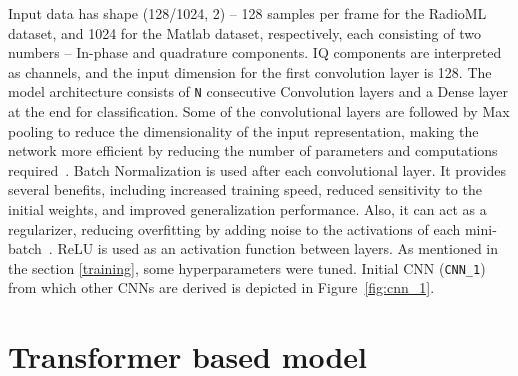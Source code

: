 Input data has shape (128/1024, 2) -- 128 samples per frame for the RadioML dataset, and 1024 for the Matlab dataset, respectively, each consisting of two numbers -- In-phase and quadrature components. IQ components are interpreted as channels, and the input dimension for the first convolution layer is 128. The model architecture consists of \verb|N| consecutive Convolution layers and a Dense layer at the end for classification. Some of the convolutional layers are followed by Max pooling to reduce the dimensionality of the input representation, making the network more efficient by reducing the number of parameters and computations required~\cite{max_pooling}. Batch Normalization is used after each convolutional layer. It provides several benefits, including increased training speed, reduced sensitivity to the initial weights, and improved generalization performance. Also, it can act as a regularizer, reducing overfitting by adding noise to the activations of each mini-batch~\cite{batch_normalization}. ReLU is used as an activation function between layers. As mentioned in the section \ref{training}, some hyperparameters were tuned. Initial CNN (\verb|CNN_1|) from which other CNNs are derived is depicted in Figure~\ref{fig:cnn_1}.





\section{Transformer based model}

